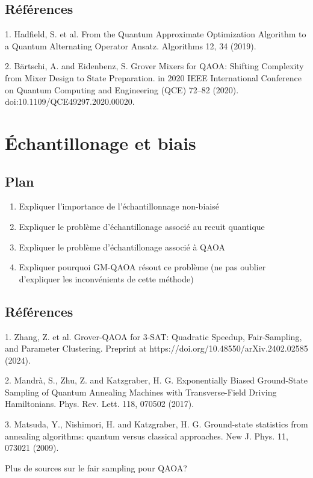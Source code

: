 \subsection*{Références}

1. Hadfield, S. et al. From the Quantum Approximate Optimization Algorithm to a Quantum Alternating Operator Ansatz. Algorithms 12, 34 (2019).

2. Bärtschi, A. and Eidenbenz, S. Grover Mixers for QAOA: Shifting Complexity from Mixer Design to State Preparation. in 2020 IEEE International Conference on Quantum Computing and Engineering (QCE) 72–82 (2020). doi:10.1109/QCE49297.2020.00020.


\section{Échantillonage et biais}

\subsection*{Plan}

\begin{enumerate}
    \item Expliquer l'importance de l'échantillonnage non-biaisé
    \item Expliquer le problème d'échantillonage associé au recuit quantique
    \item Expliquer le problème d'échantillonage associé à QAOA
    \item Expliquer pourquoi GM-QAOA résout ce problème (ne pas oublier d'expliquer les inconvénients de cette méthode)
\end{enumerate}

\subsection*{Références}

1. Zhang, Z. et al. Grover-QAOA for 3-SAT: Quadratic Speedup, Fair-Sampling, and Parameter Clustering. Preprint at https://doi.org/10.48550/arXiv.2402.02585 (2024).

2. Mandrà, S., Zhu, Z. and Katzgraber, H. G. Exponentially Biased Ground-State Sampling of Quantum Annealing Machines with Transverse-Field Driving Hamiltonians. Phys. Rev. Lett. 118, 070502 (2017).

3. Matsuda, Y., Nishimori, H. and Katzgraber, H. G. Ground-state statistics from annealing algorithms: quantum versus classical approaches. New J. Phys. 11, 073021 (2009).

Plus de sources sur le fair sampling pour QAOA?
